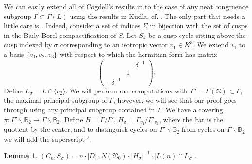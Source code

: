 \documentclass[12pt,a4paper,reqno]{amsart}
\theoremstyle{definition}
\numberwithin{definition}{subsection}
\theoremstyle{definition}
\numberwithin{Definition}{subsection}
\theoremstyle{remark}
\theoremstyle{remark}
\numberwithin{Remark}{subsection}
\theoremstyle{remark}
\theoremstyle{plain}
\numberwithin{Theorem}{subsection}
\theoremstyle{plain}
\theoremstyle{plain}
\theoremstyle{plain}
\theoremstyle{plain}
\newtheorem{Lemma}[Theorem]{Lemma}
\theoremstyle{plain}
\theoremstyle{plain}
\theoremstyle{plain}
\begin{document}
We can easily extend all of Cogdell's results in \cite{cogdell} to the case of any neat congruence subgroup $\Gamma\subset \Gamma(L)$ using the results in Kudla, cf. \cite{kudlaint}. The only part that needs a little care is \cite[Lemma 6.2]{cogdell}. Indeed, consider a set of indices $\Sigma$ in bijection with the set of cusps in the Baily-Borel compactification of $S$. Let $S_\sigma$ be a cusp cycle sitting above the cusp indexed by $\sigma$ corresponding to an isotropic vector $v_1\in K^3$. We extend $v_1$ to a basis $\{v_1,v_2,v_3\}$ with respect to which the hermitian form has matrix
\[
\begin{pmatrix}& & \delta^{-1}\\
    & 1 & \\
    -\delta^{-1} & &\end{pmatrix}.
\]
Define $L_\sigma=L\cap \langle v_2\rangle$. We will perform our computations with $\Gamma'=\Gamma(\mathfrak{N})\subset \Gamma$, the maximal principal subgroup of $\Gamma$, however, we will see that our proof goes through using any principal subgroup contained in $\Gamma$. We have a covering $\pi:\Gamma'\backslash \mathbb{B}_2\to\Gamma\backslash \mathbb{B}_2$. Define $H=\overline{\Gamma}/\overline{\Gamma}'$, $H_{\sigma}=\overline{\Gamma}_{v_1}/\overline{\Gamma}'_{v_1}$, where the bar is the quotient by the center, and to distinguish cycles on $\Gamma'\backslash \mathbb{B}_2$ from cycles on $\Gamma\backslash \mathbb{B}_2$ we will add the superscript $'$.

\begin{Lemma}
\label{extension}
$(C_n,S_\sigma)=n\cdot |D|\cdot N(\mathfrak{N}_0)\cdot |H_{\sigma}|^{-1}\cdot|L(n)\cap L_\sigma|$.
\end{Lemma}
\end{document}
